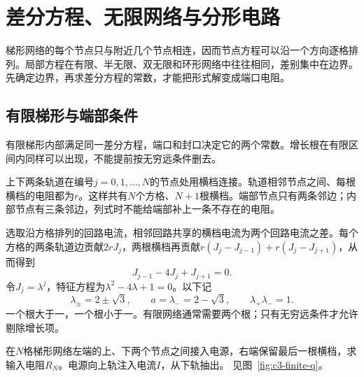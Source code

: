 \chapter{差分方程、无限网络与分形电路}
梯形网络的每个节点只与附近几个节点相连，因而节点方程可以沿一个方向逐格排列。局部方程在有限、半无限、双无限和环形网络中往往相同，差别集中在边界。先确定边界，再求差分方程的常数，才能把形式解变成端口电阻。



\section{有限梯形与端部条件}\label{sec:c3-finite}
有限梯形内部满足同一差分方程，端口和封口决定它的两个常数。增长根在有限区间内同样可以出现，不能提前按无穷远条件删去。

上下两条轨道在编号$j=0,1,\ldots,N$的节点处用横档连接。轨道相邻节点之间、每根横档的电阻都为$r$。这样共有$N$个方格、$N+1$根横档。端部节点只有两条邻边；内部节点有三条邻边，列式时不能给端部补上一条不存在的电阻。

选取沿方格排列的回路电流，相邻回路共享的横档电流为两个回路电流之差。每个方格的两条轨道边贡献$2rJ_j$，两根横档再贡献$r(J_j-J_{j-1})+r(J_j-J_{j+1})$，从而得到
\[
 J_{j-1}-4J_j+J_{j+1}=0.
\]
令$J_j=\lambda^j$，特征方程为$\lambda^2-4\lambda+1=0$。以下记
\[
 \lambda_\pm=2\pm\sqrt3,\qquad a=\lambda_-=2-\sqrt3,\qquad
 \lambda_+\lambda_-=1.
\]
一个根大于一，一个根小于一。有限网络通常需要两个根；只有无穷远条件才允许剔除增长项。

\begin{example}[有限梯形同端输入]\label{ex:c3-finite}
在$N$格梯形网络左端的上、下两个节点之间接入电源，右端保留最后一根横档，求输入电阻$R_N$。电源向上轨注入电流$I$，从下轨抽出。 见图~\ref{fig:c3-finite-q}。
\end{example}

